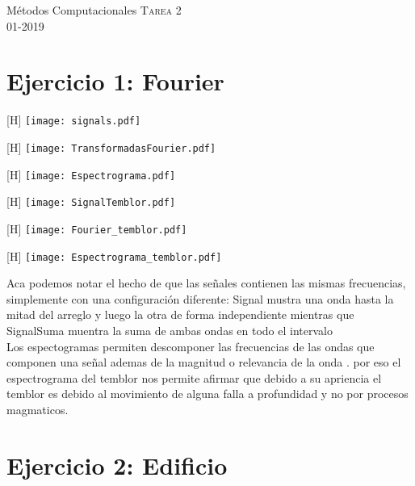 \documentclass[11pt,letterpaper]{exam}
\begin{document}
\begin{center}
{\Large Métodos Computacionales} 
\textsc{Tarea 2}\\
01-2019\\
\end{center}


\noindent
\section{Ejercicio 1: Fourier}

\begin{center}[H]
\texttt{[image: signals.pdf]} 
\caption{}
\end{center}

\begin{center}[H]
\texttt{[image: TransformadasFourier.pdf]}
\caption{ }
\end{center}

\begin{center}[H]
\texttt{[image: Espectrograma.pdf]}
\caption{}
\end{center}

\begin{center}[H]
\texttt{[image: SignalTemblor.pdf]}
\caption{}
\end{center}

\begin{center}[H]
\texttt{[image: Fourier\_temblor.pdf]}
\caption{}
\end{center}

\begin{center}[H]
\texttt{[image: Espectrograma\_temblor.pdf]}
\caption{}
\end{center}

Aca podemos notar el hecho de que las señales contienen las mismas frecuencias, simplemente  con una configuración diferente: Signal mustra una onda hasta la mitad del arreglo y luego la otra de forma independiente mientras que SignalSuma muentra la suma de ambas ondas en todo el intervalo\\


Los espectogramas permiten descomponer las frecuencias de las ondas que componen una señal ademas de la magnitud o relevancia de la onda . por eso el espectrograma del temblor nos permite afirmar que debido a su apriencia el temblor es debido al movimiento de alguna falla a profundidad y no por procesos magmaticos.\\

\noindent
\section{Ejercicio 2: Edificio}
\end{document}
